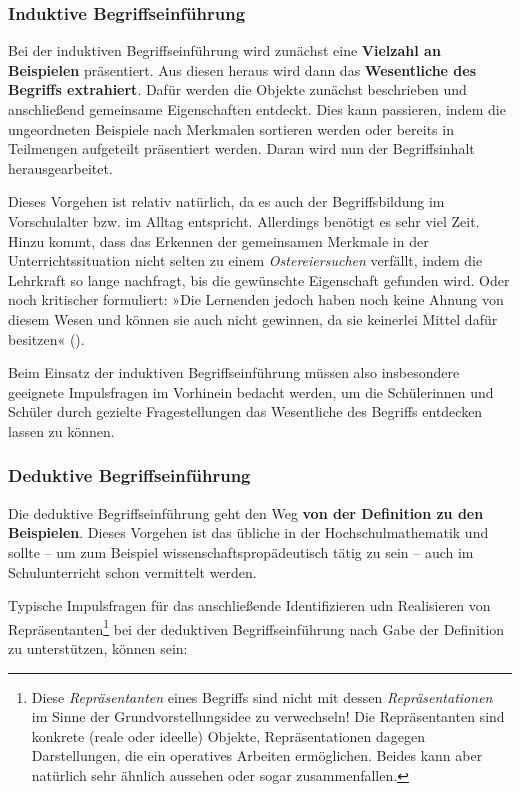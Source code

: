 \documentclass[
]{scrbook}
\theoremstyle{definition}
\theoremstyle{definition}
\theoremstyle{definition}
\theoremstyle{definition}
\theoremstyle{remark}
\begin{document}
\subsubsection{Induktive Begriffseinführung}\label{induktive-begriffseinfuxfchrung}

Bei der induktiven Begriffseinführung wird zunächst eine \textbf{Vielzahl an Beispielen} präsentiert. Aus diesen heraus wird dann das \textbf{Wesentliche des Begriffs extrahiert}. Dafür werden die Objekte zunächst beschrieben und anschließend gemeinsame Eigenschaften entdeckt. Dies kann passieren, indem die ungeordneten Beispiele nach Merkmalen sortieren werden oder bereits in Teilmengen aufgeteilt präsentiert werden. Daran wird nun der Begriffsinhalt herausgearbeitet.

Dieses Vorgehen ist relativ natürlich, da es auch der Begriffsbildung im Vorschulalter bzw. im Alltag entspricht. Allerdings benötigt es sehr viel Zeit. Hinzu kommt, dass das Erkennen der gemeinsamen Merkmale in der Unterrichtssituation nicht selten zu einem \emph{Ostereiersuchen} verfällt, indem die Lehrkraft so lange nachfragt, bis die gewünschte Eigenschaft gefunden wird. Oder noch kritischer formuliert: »Die Lernenden jedoch haben noch keine Ahnung von diesem Wesen und können sie auch nicht gewinnen, da sie keinerlei Mittel dafür besitzen« ().

Beim Einsatz der induktiven Begriffseinführung müssen also insbesondere geeignete Impulsfragen im Vorhinein bedacht werden, um die Schülerinnen und Schüler durch gezielte Fragestellungen das Wesentliche des Begriffs entdecken lassen zu können.

\subsubsection{Deduktive Begriffseinführung}\label{deduktive-begriffseinfuxfchrung}

Die deduktive Begriffseinführung geht den Weg \textbf{von der Definition zu den Beispielen}. Dieses Vorgehen ist das übliche in der Hochschulmathematik und sollte -- um zum Beispiel wissenschaftspropädeutisch tätig zu sein -- auch im Schulunterricht schon vermittelt werden.

Typische Impulsfragen für das anschließende Identifizieren udn Realisieren von Repräsentanten\footnote{Diese \emph{Repräsentanten} eines Begriffs sind nicht mit dessen \emph{Repräsentationen} im Sinne der Grundvorstellungsidee zu verwechseln! Die Repräsentanten sind konkrete (reale oder ideelle) Objekte, Repräsentationen dagegen Darstellungen, die ein operatives Arbeiten ermöglichen. Beides kann aber natürlich sehr ähnlich aussehen oder sogar zusammenfallen.} bei der deduktiven Begriffseinführung nach Gabe der Definition zu unterstützen, können sein:
\end{document}
